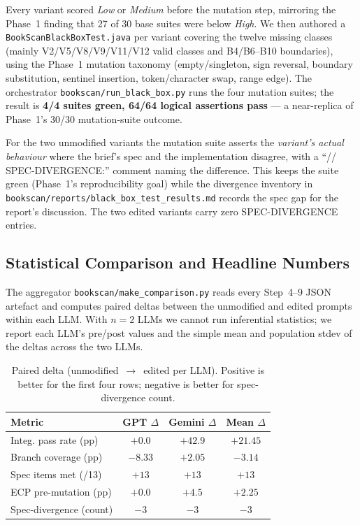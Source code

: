 \documentclass[journal]{IEEEtran}
\begin{document}
Every variant scored \emph{Low} or \emph{Medium} before the
mutation step, mirroring the Phase~1 finding that 27 of 30
base suites were below \emph{High}. We then authored a
\texttt{BookScanBlackBoxTest.java} per variant covering the
twelve missing classes (mainly V2/V5/V8/V9/V11/V12 valid
classes and B4/B6--B10 boundaries), using the Phase~1 mutation
taxonomy (empty/singleton, sign reversal, boundary
substitution, sentinel insertion, token/character swap, range
edge). The orchestrator \texttt{bookscan/run\_black\_box.py}
runs the four mutation suites; the result is
\textbf{4/4 suites green, 64/64 logical assertions pass}
--- a near-replica of Phase~1's 30/30 mutation-suite outcome.

For the two unmodified variants the mutation suite asserts the
\emph{variant's actual behaviour} where the brief's spec and
the implementation disagree, with a
``// SPEC-DIVERGENCE:'' comment naming the difference. This
keeps the suite green (Phase~1's reproducibility goal) while
the divergence inventory in
\texttt{bookscan/reports/black\_box\_test\_results.md} records
the spec gap for the report's discussion. The two edited
variants carry zero SPEC-DIVERGENCE entries.

\subsection{Statistical Comparison and Headline Numbers}
\label{sec:p2stats}

The aggregator \texttt{bookscan/make\_comparison.py} reads
every Step~4--9 JSON artefact and computes paired deltas
between the unmodified and edited prompts within each LLM. With
$n = 2$ LLMs we cannot run inferential statistics; we report
each LLM's pre/post values and the simple mean and population
stdev of the deltas across the two LLMs.

\begin{table}[!t]
\centering
\caption{Paired delta (unmodified~$\rightarrow$~edited per LLM).
Positive is better for the first four rows; negative is better
for spec-divergence count.}
\label{tab:p2paired}
\renewcommand{\arraystretch}{1.15}
\begin{tabular}{@{}p{} c c c@{}}
\toprule
\textbf{Metric}           & \textbf{GPT $\Delta$} & \textbf{Gemini $\Delta$} & \textbf{Mean $\Delta$} \\
\midrule
Integ. pass rate (pp)     & $+0.0$  & $+42.9$ & $+21.45$ \\
Branch coverage (pp)      & $-8.33$ & $+2.05$ & $-3.14$  \\
Spec items met (/13)      & $+13$   & $+13$   & $+13$    \\
ECP pre-mutation (pp)     & $+0.0$  & $+4.5$  & $+2.25$  \\
Spec-divergence (count)   & $-3$    & $-3$    & $-3$     \\
\bottomrule
\end{tabular}
\end{table}
\end{document}
